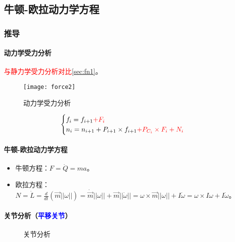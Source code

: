 \documentclass[
12pt, %
a4paper, 
oneside, %
headinclude,footinclude, %
]{scrartcl}
\begin{document}
\subsection[牛顿-欧拉动力学方程]{牛顿-欧拉动力学方程}
\subsubsection[推导]{推导}
\paragraph{动力学受力分析}\label{sec:fn2}
\textcolor{red}{与静力学受力分析对比}\ref{sec:fn1}。 \\
\begin{minipage}{0.3\textwidth}
\begin{figure}[H]
\centering 
\texttt{[image: force2]} 
\caption{动力学受力分析}
\end{figure}
\end{minipage}
\begin{minipage}{0.7\textwidth}
$$
\begin{cases}
f_i = f_{i + 1} \textcolor{red}{+ F_i} \\
n_i = n_{i + 1} + P_{i + 1} \times f_{i + 1} \textcolor{red}{+ P_{C_i} \times F_i + N_i} \\
\end{cases}
$$
\end{minipage}
\paragraph{牛顿-欧拉动力学方程}
\begin{itemize}
\item 牛顿方程：$ F = \dot{Q} = ma $。
\item 欧拉方程：$ N = \dot{L} = \frac{d}{dt}(\vec{m}||\omega||) = \dot{\vec{m}}||\omega|| + \vec{m}||\dot{\omega}|| = \omega \times \vec{m}||\omega|| + I \dot{\omega} = \omega \times I \omega + I \dot{\omega} $。
\end{itemize}
\paragraph{关节分析（\textcolor{blue}{平移关节}）}
\begin{figure}[H]
\centering
{} \quad
{}
\caption{关节分析}
\end{figure}
\end{document}
